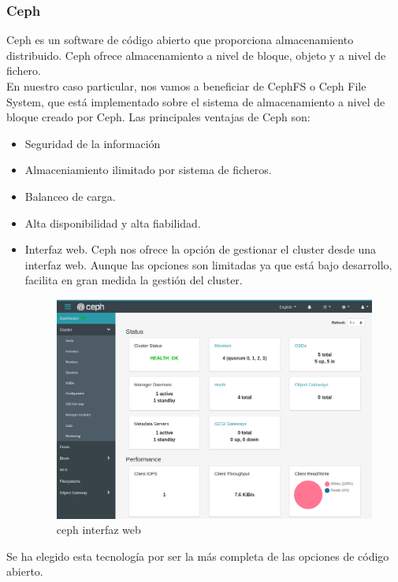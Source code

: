 		\subsubsection{Ceph}
		\begin{paragraph}
			Ceph es un software de código abierto que proporciona almacenamiento distribuido. Ceph ofrece almacenamiento a nivel de bloque, objeto y a nivel de fichero. \\
			En nuestro caso particular, nos vamos a beneficiar de CephFS o Ceph File System, que está implementado sobre el sistema de almacenamiento a nivel de bloque creado por Ceph. Las principales ventajas de Ceph son:
			\begin{itemize}
				\item Seguridad de la información
				\item Almaceniamiento ilimitado por sistema de ficheros.
				\item Balanceo de carga.
				\item Alta disponibilidad y alta fiabilidad.
				\item Interfaz web. Ceph nos ofrece la opción de gestionar el cluster desde una interfaz web. Aunque las opciones son limitadas ya que está bajo desarrollo, facilita en gran medida la gestión del cluster.
				
				\begin{figure}[!hbt]
					\centering
					\includegraphics[scale=0.35]{imagenes/Diseno/ceph_wui.png}
					\caption[ceph interfaz web]{ceph interfaz web} 
					\label{ceph_wui}
				\end{figure}
			\end{itemize}
		
			Se ha elegido esta tecnología por ser la más completa de las opciones de código abierto. 
			
		\end{paragraph}
	
